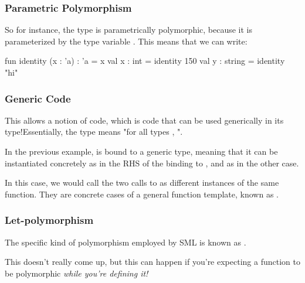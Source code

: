 \documentclass[aspectratio=169, handout]{beamer}
\begin{document}
\begin{frame}[fragile]
  \frametitle{Parametric Polymorphism}


  \pause
  \vspace{\fill}

  So for instance, the type  is parametrically polymorphic,
  because it is parameterized by the type variable . This means
  that we can write:

  \pause
  \vspace{\fill}

  \begin{codeblock}
    fun identity (x : 'a) : 'a = x
    val x : int = identity 150
    val y : string = identity "hi"
  \end{codeblock}
\end{frame}

\begin{frame}[fragile]
  \frametitle{Generic Code}

  This allows a notion of  code, which is code that can be 
  used generically in its type!\footnotemark Essentially, the type 
   means "for all types , ".

  \pause
  \vspace{\fill}

  In the previous example,  is bound to a generic type, meaning
  that it can be instantiated concretely as  in the RHS of 
  the binding to , and as  in the other case. 

  \pause
  \vspace{\fill}

  In this case, we would call the two calls to  as different
  instances of the same function. They are concrete cases of a general 
  function template, known as .
 
\end{frame}

\begin{frame}[fragile]
  \frametitle{Let-polymorphism}

  The specific kind of polymorphism employed by SML is known as .\footnotemark

  \pause
  \vspace{\fill}


  \pause
  \vspace{\fill}

  This doesn't really come up, but this can happen if you're expecting a 
  function to be polymorphic \textit{while you're defining it!}

\end{frame}
\end{document}
